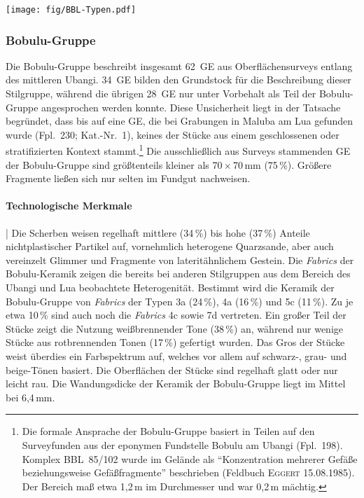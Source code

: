 \begin{figure*}[tb]
	\begin{minipage}[b]{.8\textwidth}
		\texttt{[image: fig/BBL-Typen.pdf]}
	\end{minipage}\hfill
	\begin{minipage}[b]{.2\textwidth}
		\caption{Bobulu-Gruppe: Typvertreter.\\1:~Taf.~25.13; 2:~Taf.~5.3; 3:~Taf.~5.4; 4:~Taf.~6.4.}
		\label{fig:BBL_Typverteter}
	\end{minipage}
\end{figure*}

\subsubsection{Bobulu-Gruppe}\label{sec:BBL-Gr}

Die Bobulu-Gruppe beschreibt insgesamt 62~GE aus Oberflächensurveys entlang des mittleren \mbox{Ubangi}. 34~GE bilden den Grundstock für die Beschreibung dieser Stilgruppe, während die übrigen 28~GE nur unter Vorbehalt als Teil der Bobulu-Gruppe angesprochen werden konnte. Diese Unsicherheit liegt in der Tatsache begründet, dass bis auf eine GE, die bei Grabungen in Maluba am Lua gefunden wurde (Fpl.~230; Kat.-Nr.~1), keines der Stücke aus einem geschlossenen oder stratifizierten Kontext stammt.\footnote{Die formale Ansprache der Bobulu-Gruppe basiert in Teilen auf den Surveyfunden aus der eponymen Fundstelle Bobulu am \mbox{Ubangi} (Fpl.~198). Komplex BBL~85/102 wurde im Gelände als \enquote{Konzentration mehrerer Gefäße beziehungsweise Gefäßfragmente} beschrieben (Feldbuch \textsc{Eggert} 15.08.1985). Der Bereich maß etwa 1,2\,m im Durchmesser und war 0,2\,m mächtig.} Die ausschließlich aus Surveys stammenden GE der Bobulu-Gruppe sind größtenteils kleiner als 70\,$\times$\,70\,mm (75\,\%). Größere Fragmente ließen sich nur selten im Fundgut nachweisen.

\paragraph{Technologische Merkmale}\hspace{-.5em}|\hspace{.5em}%
Die Scherben weisen regelhaft mittlere (34\,\%) bis hohe (37\,\%) Anteile nichtplastischer Partikel auf, vornehmlich heterogene Quarzsande, aber auch vereinzelt Glimmer und Fragmente von lateritähnlichem Gestein. Die \textit{Fabrics} der Bobulu-Keramik zeigen die bereits bei anderen Stilgruppen aus dem Bereich des \mbox{Ubangi} und Lua beobachtete Heterogenität. Bestimmt wird die Keramik der Bobulu-Gruppe von \textit{Fabrics} der Typen 3a (24\,\%), 4a (16\,\%) und 5c (11\,\%). Zu je etwa 10\,\% sind auch noch die \textit{Fabrics} 4c sowie 7d vertreten. Ein großer Teil der Stücke zeigt die Nutzung weißbrennender Tone (38\,\%) an, während nur wenige Stücke aus rotbrennenden Tonen (17\,\%) gefertigt wurden. Das Gros der Stücke weist überdies ein Farbspektrum auf, welches vor allem auf schwarz-, grau- und beige-Tönen basiert. Die Oberflächen der Stücke sind regelhaft glatt oder nur leicht rau. Die Wandungsdicke der Keramik der Bobulu-Gruppe liegt im Mittel bei 6,4\,mm.

